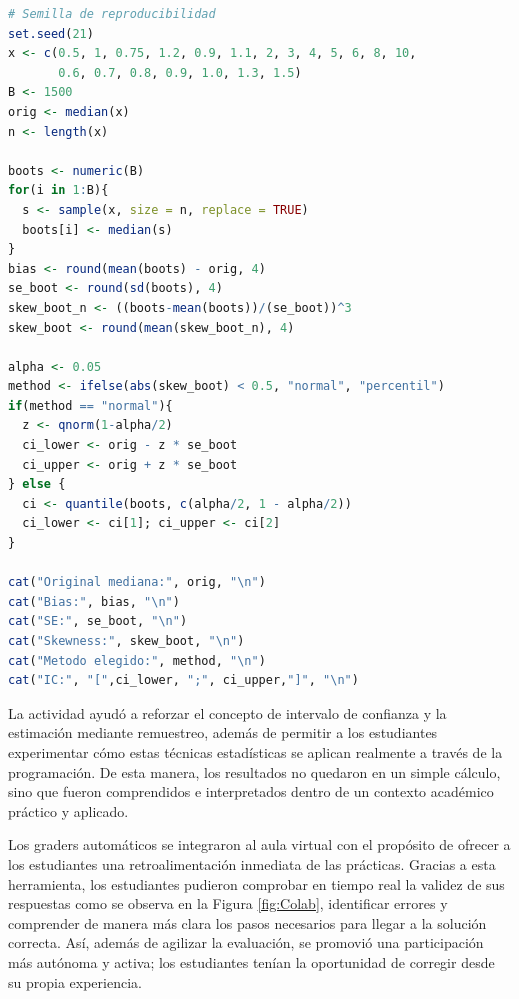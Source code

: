 \documentclass[letter,oneside,12pt,spanish]{report}
\begin{document}
\begin{lstlisting}[language=R, caption={Implementación del método bootstrap y Skewness para la mediana en R}]
# Semilla de reproducibilidad
set.seed(21)
x <- c(0.5, 1, 0.75, 1.2, 0.9, 1.1, 2, 3, 4, 5, 6, 8, 10, 
       0.6, 0.7, 0.8, 0.9, 1.0, 1.3, 1.5)
B <- 1500
orig <- median(x)
n <- length(x)

boots <- numeric(B)
for(i in 1:B){
  s <- sample(x, size = n, replace = TRUE)
  boots[i] <- median(s)
}
bias <- round(mean(boots) - orig, 4)
se_boot <- round(sd(boots), 4)
skew_boot_n <- ((boots-mean(boots))/(se_boot))^3
skew_boot <- round(mean(skew_boot_n), 4)

alpha <- 0.05
method <- ifelse(abs(skew_boot) < 0.5, "normal", "percentil")
if(method == "normal"){
  z <- qnorm(1-alpha/2)
  ci_lower <- orig - z * se_boot
  ci_upper <- orig + z * se_boot
} else {
  ci <- quantile(boots, c(alpha/2, 1 - alpha/2))
  ci_lower <- ci[1]; ci_upper <- ci[2]
}

cat("Original mediana:", orig, "\n")
cat("Bias:", bias, "\n")
cat("SE:", se_boot, "\n")
cat("Skewness:", skew_boot, "\n")
cat("Metodo elegido:", method, "\n")
cat("IC:", "[",ci_lower, ";", ci_upper,"]", "\n")
\end{lstlisting}

La actividad ayudó a reforzar el concepto de intervalo de confianza y la estimación mediante remuestreo, además de permitir a los estudiantes experimentar cómo estas técnicas estadísticas se aplican realmente a través de la programación. De esta manera, los resultados no quedaron en un simple cálculo, sino que fueron comprendidos e interpretados dentro de un contexto académico práctico y aplicado.

Los graders automáticos se integraron al aula virtual con el propósito de ofrecer a los estudiantes una retroalimentación inmediata de las prácticas. Gracias a esta herramienta, los estudiantes pudieron comprobar en tiempo real la validez de sus respuestas como se observa en la Figura \ref{fig:Colab}, identificar errores y comprender de manera más clara los pasos necesarios para llegar a la solución correcta. Así, además de agilizar la evaluación, se promovió una participación más autónoma y activa; los estudiantes tenían la oportunidad de corregir desde su propia experiencia.
\end{document}
